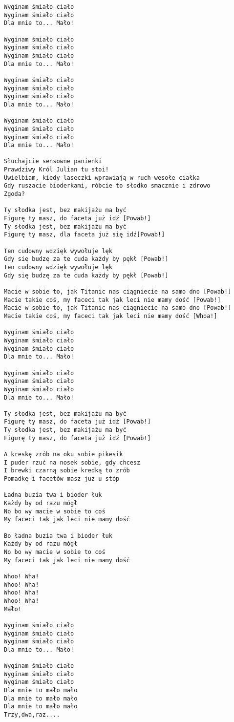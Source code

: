 \documentclass[12pt]{article}
\begin{document}
\begin{verbatim}
Wyginam śmiało ciało
Wyginam śmiało ciało
Dla mnie to... Mało!

Wyginam śmiało ciało
Wyginam śmiało ciało
Wyginam śmiało ciało
Dla mnie to... Mało!

Wyginam śmiało ciało
Wyginam śmiało ciało
Wyginam śmiało ciało
Dla mnie to... Mało!

Wyginam śmiało ciało
Wyginam śmiało ciało
Wyginam śmiało ciało
Dla mnie to... Mało!

Słuchajcie sensowne panienki
Prawdziwy Król Julian tu stoi!
Uwielbiam, kiedy laseczki wprawiają w ruch wesołe ciałka
Gdy ruszacie bioderkami, róbcie to słodko smacznie i zdrowo
Zgoda?

Ty słodka jest, bez makijażu ma być
Figurę ty masz, do faceta już idź [Powab!]
Ty słodka jest, bez makijażu ma być
Figurę ty masz, dla faceta już się idź[Powab!]

Ten cudowny wdzięk wywołuje lęk
Gdy się budzę za te cuda każdy by pękł [Powab!]
Ten cudowny wdzięk wywołuje lęk
Gdy się budzę za te cuda każdy by pękł [Powab!]

Macie w sobie to, jak Titanic nas ciągniecie na samo dno [Powab!]
Macie takie coś, my faceci tak jak leci nie mamy dość [Powab!]
Macie w sobie to, jak Titanic nas ciągniecie na samo dno [Powab!]
Macie takie coś, my faceci tak jak leci nie mamy dość [Whoa!]

Wyginam śmiało ciało
Wyginam śmiało ciało
Wyginam śmiało ciało
Dla mnie to... Mało!

Wyginam śmiało ciało
Wyginam śmiało ciało
Wyginam śmiało ciało
Dla mnie to... Mało!

Ty słodka jest, bez makijażu ma być
Figurę ty masz, do faceta już idź [Powab!]
Ty słodka jest, bez makijażu ma być
Figurę ty masz, do faceta już idź [Powab!]

A kreskę zrób na oku sobie pikesik
I puder rzuć na nosek sobie, gdy chcesz
I brewki czarną sobie kredką to zrób
Pomadkę i facetów masz już u stóp

Ładna buzia twa i bioder łuk
Każdy by od razu mógł
No bo wy macie w sobie to coś
My faceci tak jak leci nie mamy dość

Bo ładna buzia twa i bioder łuk
Każdy by od razu mógł
No bo wy macie w sobie to coś
My faceci tak jak leci nie mamy dość

Whoo! Wha!
Whoo! Wha!
Whoo! Wha!
Whoo! Wha!
Mało!

Wyginam śmiało ciało
Wyginam śmiało ciało
Wyginam śmiało ciało
Dla mnie to... Mało!

Wyginam śmiało ciało
Wyginam śmiało ciało
Wyginam śmiało ciało
Dla mnie to mało mało
Dla mnie to mało mało
Dla mnie to mało mało
Trzy,dwa,raz....
\end{verbatim}
\clearpage
\end{document}
